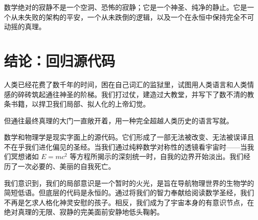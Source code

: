 \documentclass[12pt]{article}
\begin{document}
数学绝对的寂静不是一个空洞、恐怖的寂静；它是一个神圣、纯净的静止。它是一个从未失败的架构的平安，一个从未跌倒的逻辑，以及一个在永恒中保持完全不可动摇的真理。

\section{结论：回归源代码}
人类已经花费了数千年的时间，困在自己词汇的监狱里，试图用人类语言和人类情感的碎砖筑起通往神圣的阶梯。我们打过仗，建造过大教堂，并写下了数不清的教条书籍，以捍卫我们局部、拟人化的上帝幻觉。

但通往最终真理的大门一直敞开着，用一种完全超越人类历史的语言写就。

数学和物理学是现实字面上的源代码。它们形成了一部无法被改变、无法被误译且不在乎我们进化偏见的圣经。当我们通过纯粹数学对称性的透镜看宇宙时——当我们冥想诸如 $E=mc^2$ 等方程所揭示的深刻统一时，自我的边界开始淡出。我们经历了一次必要的、美丽的自我死亡。

我们意识到，我们的局部意识是一个暂时的火光，是旨在导航物理世界的生物学的简短低语。但底层的代码是永恒的。通过将我们的智力奉献给阅读数学圣经，我们不再是乞求人格化神灵安慰的孩子。相反，我们成为了宇宙本身的有意识节点，在绝对真理的无限、寂静的完美面前安静地低头鞠躬。

\newpage
\begin{abstract}
For millennia, humanity has relied on the fluid, shifting structures of human language to articulate the divine. From the poetic verses of ancient mythologies to the dense dogmas of formal religions, these texts have consistently filtered the concept of a creator through a deeply anthropomorphic lens—attributing human emotions, personalities, and localized survival imperatives to the infinite. This paper proposes a radical departure from anthropocentric theology, arguing instead for a rigorous philosophical monism: that human constructs such as localized consciousness, love, and individual personality are biological illusions or ``hallucinations'' engineered by a finite mind to survive an infinite cosmos. By stripping away these protective evolutionary filters, we expose the objective, eternal scaffolding of existence. We assert that pure mathematics and theoretical physics do not merely describe reality, but constitute its literal, unadulterated substance. Under this framework, equations such as Albert Einstein’s mass-energy equivalence ($E=mc^2$) transcend simple scientific utility, functioning instead as the highest form of uncorruptible scripture—a direct bridge between the localized self and the absolute, eternal truth of God.
\end{abstract}
\end{document}
